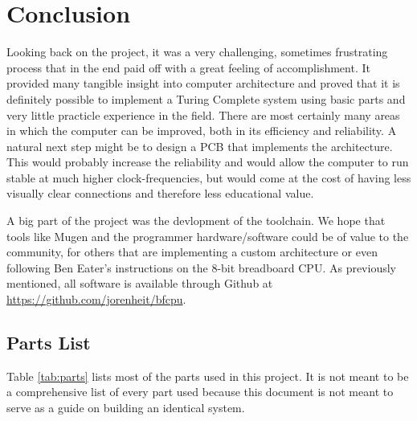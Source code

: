 \section{Conclusion}

Looking back on the project, it was a very challenging, sometimes frustrating process that in the end paid off with a great feeling of accomplishment. It provided many tangible insight into computer architecture and proved that it is definitely possible to implement a Turing Complete system using basic parts and very little practicle experience in the field. There are most certainly many areas in which the computer can be improved, both in its efficiency and reliability. A natural next step might be to design a PCB that implements the architecture. This would probably increase the reliability and would allow the computer to run stable at much higher clock-frequencies, but would come at the cost of having less visually clear connections and therefore less educational value.

A big part of the project was the devlopment of the toolchain. We hope that tools like Mugen and the programmer hardware/software could be of value to the community, for others that are implementing a custom architecture or even following Ben Eater's instructions on the 8-bit breadboard CPU. As previously mentioned, all software is available through Github at \url{https://github.com/jorenheit/bfcpu}.

\subsection{Parts List}
Table \ref{tab:parts} lists most of the parts used in this project. It is not meant to be a comprehensive list of every part used because this document is not meant to serve as a guide on building an identical system. 


